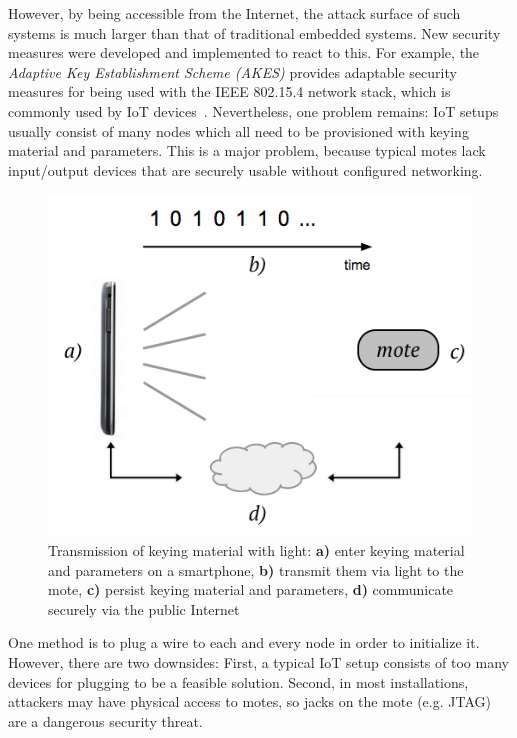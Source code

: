 \documentclass{sig-alternate} %
\begin{document}
However, by being accessible from the Internet, the attack surface of such systems is much larger than that of traditional embedded systems.
New security measures were developed and implemented to react to this.
For example, the \textit{Adaptive Key Establishment Scheme (AKES)} provides adaptable security measures for being used with the IEEE 802.15.4 network stack, which is commonly used by IoT devices~\cite{krentz15akes}.
Nevertheless, one problem remains: IoT setups usually consist of many nodes which all need to be provisioned with keying material and parameters.
This is a major problem, because typical motes lack input/output devices that are securely usable without configured networking.

\begin{figure}
	\centering
	\includegraphics[scale=.4]{images/overview.png}
	\caption{Transmission of keying material with light: \textbf{a)} enter keying material and parameters on a smartphone, \textbf{b)} transmit them via light to the mote, \textbf{c)} persist keying material and parameters, \textbf{d)} communicate securely via the public Internet }
	\label{fig:overview}
\end{figure}

One method is to plug a wire to each and every node in order to initialize it.
However, there are two downsides: First, a typical IoT setup consists of too many devices for plugging to be a feasible solution. Second, in most installations, attackers may have physical access to motes, so jacks on the mote (e.g. JTAG) are a dangerous security threat.
\end{document}
